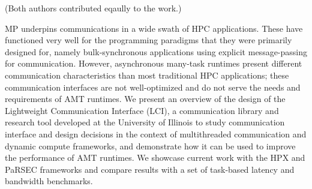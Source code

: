 \begin{center}
    (Both authors contributed eqaully to the work.)
\end{center}
MP underpins communications in a wide swath of HPC applications. These have functioned very well for the programming paradigms that they were primarily designed for, namely bulk-synchronous applications using explicit message-passing for communication. However, asynchronous many-task runtimes present different communication characteristics than most traditional HPC applications; these communication interfaces are not well-optimized and do not serve the needs and requirements of AMT runtimes. We present an overview of the design of the Lightweight Communication Interface (LCI), a communication library and research tool developed at the University of Illinois to study communication interface and design decisions in the context of multithreaded communication and dynamic compute frameworks, and demonstrate how it can be used to improve the performance of AMT runtimes. We showcase current work with the HPX and PaRSEC frameworks and compare results with a set of task-based latency and bandwidth benchmarks.

